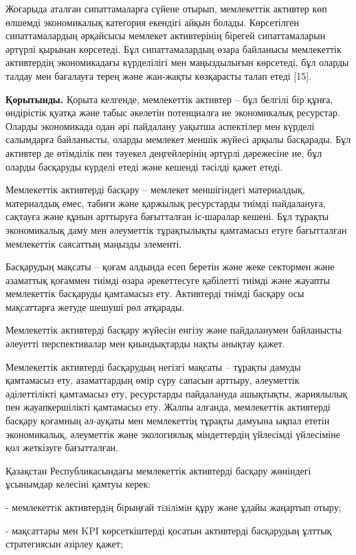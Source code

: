 \begin{multicols}{2}
Жоғарыда аталған сипаттамаларға сүйене отырып, мемлекеттік активтер көп
өлшемді экономикалық категория екендігі айқын болады. Көрсетілген
сипаттамалардың әрқайсысы мемлекет активтерінің бірегей сипаттамаларын
әртүрлі қырынан көрсетеді. Бұл сипаттамалардың өзара байланысы
мемлекеттік активтердің экономикадағы күрделілігі мен маңыздылығын
көрсетеді, бұл оларды талдау мен бағалауға терең және жан-жақты
көзқарасты талап етеді {[}15{]}.

{\bfseries Қорытынды.} Қорыта келгенде, мемлекеттік активтер -- бұл белгілі
бір құнға, өндірістік қуатқа және табыс әкелетін потенциалға ие
экономикалық ресурстар. Оларды экономикада одан әрі пайдалану уақытша
аспектілер мен күрделі салымдарға байланысты, оларды мемлекет меншік
жүйесі арқылы басқарады. Бұл активтер де өтімділік пен тәуекел
деңгейлерінің әртүрлі дәрежесіне ие, бұл оларды басқаруды күрделі етеді
және кешенді тәсілді қажет етеді.

Мемлекеттік активтерді басқару -- мемлекет меншігіндегі материалдық,
материалдық емес, табиғи және қаржылық ресурстарды тиімді пайдалануға,
сақтауға және құнын арттыруға бағытталған іс-шаралар кешені. Бұл тұрақты
экономикалық даму мен әлеуметтік тұрақтылықты қамтамасыз етуге
бағытталған мемлекеттік саясаттың маңызды элементі.

Басқарудың мақсаты -- қоғам алдында есеп беретін және жеке сектормен
және азаматтық қоғаммен тиімді өзара әрекеттесуге қабілетті тиімді және
жауапты мемлекеттік басқаруды қамтамасыз ету. Активтерді тиімді басқару
осы мақсаттарға жетуде шешуші рөл атқарады.

Мемлекеттік активтерді басқару жүйесін енгізу және пайдаланумен
байланысты әлеуетті перспективалар мен қиындықтарды нақты анықтау қажет.

Мемлекеттік активтерді басқарудың негізгі мақсаты -- тұрақты дамуды
қамтамасыз ету, азаматтардың өмір сүру сапасын арттыру, әлеуметтік
әділеттілікті қамтамасыз ету, ресурстарды пайдалануда ашықтықты,
жариялылық пен жауапкершілікті қамтамасыз ету. Жалпы алғанда,
мемлекеттік активтерді басқару қоғамның әл-ауқаты мен мемлекеттің
тұрақты дамуына ықпал ететін экономикалық, әлеуметтік және экологиялық
міндеттердің үйлесімді үйлесіміне қол жеткізуге бағытталған.

Қазақстан Республикасындағы мемлекеттік активтерді басқару жөніндегі
ұсынымдар келесіні қамтуы керек:

- мемлекеттiк активтердiң бiрыңғай тiзiлiмiн құру және ұдайы жаңартып
отыру;

- мақсаттары мен KPI көрсеткіштерді қосатын активтерді басқарудың ұлттық
стратегиясын әзірлеу қажет;


\end{multicols}
